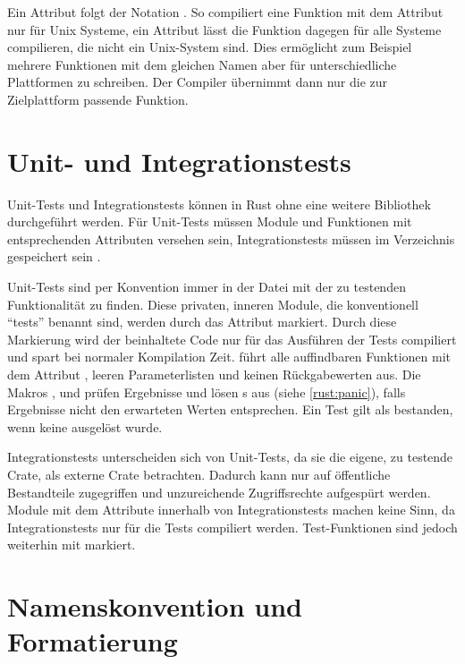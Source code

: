 Ein Attribut folgt der Notation . So compiliert eine Funktion mit dem Attribut  nur für Unix Systeme, ein Attribut  lässt die Funktion dagegen für alle Systeme compilieren, die nicht ein Unix-System sind.
Dies ermöglicht zum Beispiel mehrere Funktionen mit dem gleichen Namen aber für unterschiedliche Plattformen zu schreiben.
Der Compiler übernimmt dann nur die zur Zielplattform passende Funktion.

\section{Unit- und Integrationstests}
\label{rust:tests}

Unit-Tests und Integrationstests können in Rust ohne eine weitere Bibliothek durchgeführt werden.
Für Unit-Tests müssen Module und Funktionen mit entsprechenden Attributen versehen sein, Integrationstests müssen im Verzeichnis  gespeichert sein \cite{rust:book:tests}.

Unit-Tests sind per Konvention immer in der Datei mit der zu testenden Funktionalität zu finden.
Diese privaten, inneren Module, die konventionell \enquote{tests} benannt sind, werden durch das Attribut  markiert.
Durch diese Markierung wird der beinhaltete Code nur für das Ausführen der Tests compiliert und spart bei normaler Kompilation Zeit.
 führt alle auffindbaren Funktionen mit dem Attribut \rustcinline{#[test]}, leeren Parameterlisten und keinen Rückgabewerten aus.
Die Makros ,  und  prüfen Ergebnisse und lösen s aus (siehe \autoref{rust:panic}), falls Ergebnisse nicht den erwarteten Werten entsprechen.
Ein Test gilt als bestanden, wenn keine  ausgelöst wurde.

Integrationstests unterscheiden sich von Unit-Tests, da sie die eigene, zu testende Crate, als externe Crate betrachten.
Dadurch kann nur auf öffentliche Bestandteile zugegriffen und unzureichende Zugriffsrechte aufgespürt werden.
Module mit dem Attribute  innerhalb von Integrationstests machen keine Sinn, da Integrationstests nur für die Tests compiliert werden.
Test-Funktionen sind jedoch weiterhin mit \rustcinline{#[test]} markiert.


\section{Namenskonvention und Formatierung}
\label{rust:styleguide}

